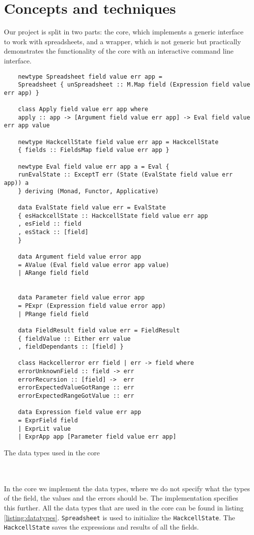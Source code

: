 \documentclass{article}
\begin{document}
	\section{Concepts and techniques}
	Our project is split in two parts: the core, which implements a generic interface to work with spreadsheets, and a wrapper, which is not generic but practically demonstrates the functionality of the core with an interactive command line interface.
\begin{listing}
	\begin{verbatim}
	newtype Spreadsheet field value err app =
	Spreadsheet { unSpreadsheet :: M.Map field (Expression field value err app) }
	
	class Apply field value err app where
	apply :: app -> [Argument field value err app] -> Eval field value err app value
	
	newtype HackcellState field value err app = HackcellState
	{ fields :: FieldsMap field value err app }
	
	newtype Eval field value err app a = Eval {
	runEvalState :: ExceptT err (State (EvalState field value err app)) a
	} deriving (Monad, Functor, Applicative)
	
	data EvalState field value err = EvalState
	{ esHackcellState :: HackcellState field value err app
	, esField :: field
	, esStack :: [field]
	}
	
	data Argument field value error app
	= AValue (Eval field value error app value)
	| ARange field field
	
	
	data Parameter field value error app
	= PExpr (Expression field value error app)
	| PRange field field
	
	data FieldResult field value err = FieldResult
	{ fieldValue :: Either err value
	, fieldDependants :: [field] }
	
	class Hackcellerror err field | err -> field where
	errorUnknownField :: field -> err
	errorRecursion :: [field] ->  err
	errorExpectedValueGotRange :: err
	errorExpectedRangeGotValue :: err
	
	data Expression field value err app
	= ExprField field
	| ExprLit value
	| ExprApp app [Parameter field value err app]
	\end{verbatim}
	\caption{The data types used in the core}
	\label{listing:datatypes}
\end{listing}
\\\\	
	In the core we implement the data types, where we do not specify what the types of the field, the values and the errors should be. The implementation specifies this further. All the data types that are used in the core can be found in listing \ref{listing:datatypes}. \texttt{Spreadsheet} is used to initialize the \texttt{HackcellState}. The \texttt{HackcellState} saves the expressions and results of all the fields.
\end{document}
